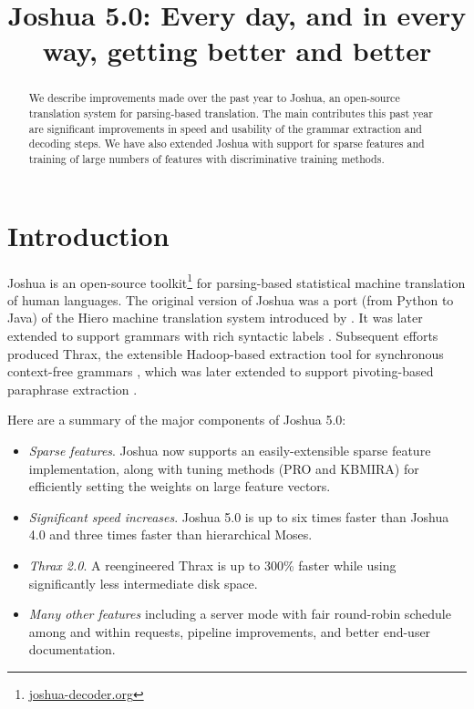 \documentclass[11pt]{article}
\title{Joshua 5.0: Every day, and in every way, getting better and better}
\date{}
\begin{document}
\maketitle

\begin{abstract}
  We describe improvements made over the past year to Joshua, an
  open-source translation system for parsing-based translation. The
  main contributes this past year are significant improvements in
  speed and usability of the grammar extraction and decoding steps. We
  have also extended Joshua with support for sparse features and
  training of large numbers of features with discriminative training
  methods.
\end{abstract}

\section{Introduction}
\label{sec-intro}

Joshua is an open-source toolkit\footnote{\url{joshua-decoder.org}}
for parsing-based statistical machine translation of human languages.
The original version of Joshua \cite{Joshua-WMT} was a port (from
Python to Java) of the Hiero machine translation system introduced by
.  It was later extended to support grammars with
rich syntactic labels \cite{li2010joshua}. Subsequent efforts produced
Thrax, the extensible Hadoop-based extraction tool for synchronous
context-free grammars \cite{Joshua-3.0}, which was later extended to
support pivoting-based paraphrase extraction \cite{Joshua-4.0}.

Here are a summary of the major components of Joshua 5.0:

\begin{itemize}
  \item \emph{Sparse features}. Joshua now supports an
    easily-extensible sparse feature implementation, along with tuning
    methods (PRO and KBMIRA) for efficiently setting the weights on
    large feature vectors.
  \item \emph{Significant speed increases}. Joshua 5.0 is up to six
    times faster than Joshua 4.0 and three times faster than
    hierarchical Moses.
  \item \emph{Thrax 2.0}. A reengineered Thrax is up to 300\% faster
    while using significantly less intermediate disk space.
  \item \emph{Many other features} including a server mode with fair
    round-robin schedule among and within requests, pipeline
    improvements, and better end-user documentation.
\end{itemize}
\end{document}
